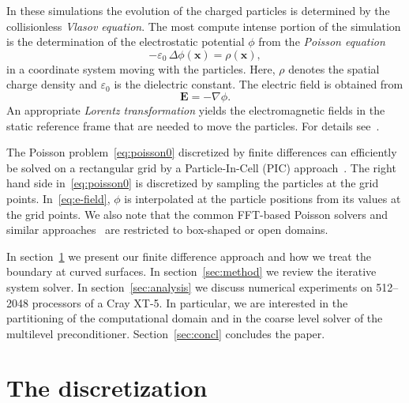 \documentclass[oribibl]{llncs}
\begin{document}
In these simulations the evolution of the charged particles is
determined by the collisionless \emph{Vlasov equation}.  The most
compute intense portion of the simulation is the determination of the
electrostatic potential $\phi$ from the \emph{Poisson equation}
\begin{equation}\label{eq:poisson0}
  - \varepsilon_0\, \Delta {\phi}(\mathbf{x}) =
  {\rho}(\mathbf{x}),
\end{equation}
in a coordinate system moving with the particles.  Here, $\rho$ denotes
the spatial charge density and $\varepsilon_0$ is the dielectric
constant.  The electric field is obtained from
\begin{equation}\label{eq:e-field}
  \mathbf{E} = -\nabla{\phi}.
\end{equation}
An appropriate \emph{Lorentz transformation} yields the electromagnetic
fields in the static reference frame that are needed to move the
particles.  For details see~\cite{adai:10}.

The Poisson problem~\eqref{eq:poisson0} discretized by finite
differences can efficiently be solved on a rectangular grid by a
Particle-In-Cell (PIC) approach~\cite{qiry:01}.  The right hand side
in~\eqref{eq:poisson0} is discretized by sampling the particles at the
grid points.  In~\eqref{eq:e-field}, ${\phi}$ is interpolated at the
particle positions from its values at the grid points.  We also note
that the common FFT-based Poisson solvers and similar
approaches~\cite{qiry:01,qigl:04} are restricted to box-shaped or open
domains.

In section~\ref{sec:discr} we present our finite difference approach and
how we treat the boundary at curved surfaces.  In
section~\ref{sec:method} we review the iterative system solver.  In
section~\ref{sec:analysis} we discuss numerical experiments on 512--2048
processors of a Cray XT-5.  In particular, we are interested in the
partitioning of the computational domain and in the coarse level solver
of the multilevel preconditioner.  Section~\ref{sec:concl} concludes the
paper.

\section{The discretization}
\label{sec:discr}
\end{document}
